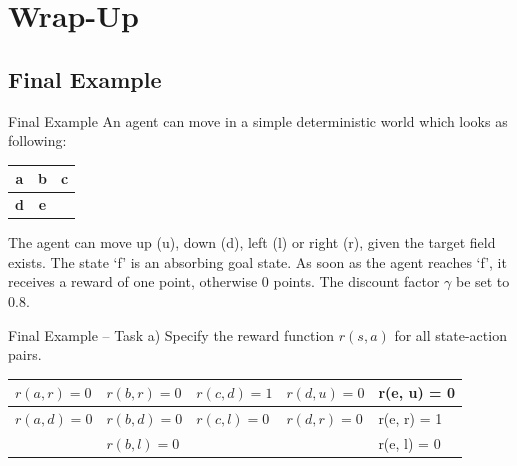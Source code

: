 \section{Wrap-Up}

\subsection{Final Example}

\begin{frame}{Final Example}{}
	An agent can move in a simple deterministic world which looks as following:

	\begin{table}
		\centering
		\begin{tabular}{| c | c | c |}
			\hline
			\textbf{a} & \textbf{b} & \textbf{c} 		\\ \hline
			\textbf{d} & \textbf{e} & \highlight{f}		\\ \hline
		\end{tabular}
	\end{table}

	The agent can move up (u), down (d), left (l) or right (r), given the target field exists. The state `f' is an absorbing goal state. As soon as the agent reaches `f',
	it receives a reward of one point, otherwise 0 points. The discount factor $\gamma$ be set to 0.8.
\end{frame}


\begin{frame}{Final Example -- Task a)}{}
	Specify the reward function $r(s, a)$ for all state-action pairs.
	
	\begin{table}
		\centering
		\begin{tabular}{| l | l | l | l | l |}
			\hline
			$r(a, r) = 0$ 	& 	$r(b, r) = 0$ 	& 	$r(c, d) = 1$ 	& $r(d, u) = 0$ 		& r(e, u) = 0		\\ \hline
			$r(a, d) = 0$ 	& 	$r(b, d) = 0$ 	& 	$r(c, l) = 0$ 	& $r(d, r) = 0$ 		& r(e, r) = 1		\\ \hline
			 			& 	$r(b, l) = 0$ 	&  				& 				& r(e, l) = 0		\\ \hline
		\end{tabular}
	\end{table}
\end{frame}


